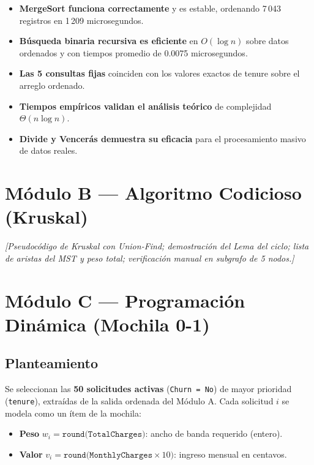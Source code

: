\documentclass[12pt, a4paper]{article}
\begin{document}
\begin{itemize}
  \item \textbf{MergeSort funciona correctamente} y es estable, ordenando 7\,043 registros en 1\,209 microsegundos.
  \item \textbf{Búsqueda binaria recursiva es eficiente} en $O(\log n)$ sobre datos ordenados y con tiempos promedio de 0.0075 microsegundos.
  \item \textbf{Las 5 consultas fijas} coinciden con los valores exactos de tenure sobre el arreglo ordenado.
  \item \textbf{Tiempos empíricos validan el análisis teórico} de complejidad $\Theta(n \log n)$.
  \item \textbf{Divide y Vencerás demuestra su eficacia} para el procesamiento masivo de datos reales.
\end{itemize}
\section{Módulo B — Algoritmo Codicioso (Kruskal)}
\textit{[Pseudocódigo de Kruskal con Union-Find; demostración del Lema del ciclo; lista de aristas del MST y peso total; verificación manual en subgrafo de 5 nodos.]}

\section{Módulo C — Programación Dinámica (Mochila 0-1)}

\subsection{Planteamiento}

Se seleccionan las \textbf{50 solicitudes activas} (\texttt{Churn = No}) de mayor prioridad (\texttt{tenure}), extraídas de la salida ordenada del Módulo A. Cada solicitud $i$ se modela como un ítem de la mochila:

\begin{itemize}
  \item \textbf{Peso} $w_i = \texttt{round(TotalCharges)}$: ancho de banda requerido (entero).
  \item \textbf{Valor} $v_i = \texttt{round(MonthlyCharges} \times 10)$: ingreso mensual en centavos.
\end{itemize}
\end{document}
